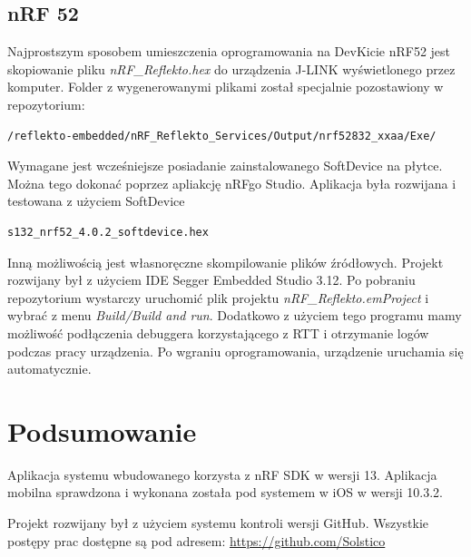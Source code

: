 \documentclass[a4paper,11pt]{article}
\begin{document}
\subsection{nRF 52}
Najprostszym sposobem umieszczenia oprogramowania na DevKicie nRF52 jest skopiowanie pliku \textit{nRF\_Reflekto.hex} do urządzenia J-LINK wyświetlonego przez komputer. Folder z wygenerowanymi plikami został specjalnie pozostawiony w repozytorium: \begin{lstlisting}
/reflekto-embedded/nRF_Reflekto_Services/Output/nrf52832_xxaa/Exe/
\end{lstlisting} 
Wymagane jest wcześniejsze posiadanie zainstalowanego SoftDevice na płytce. Można tego dokonać poprzez apliakcję nRFgo Studio. Aplikacja była rozwijana i testowana z użyciem SoftDevice
\begin{lstlisting}
s132_nrf52_4.0.2_softdevice.hex
\end{lstlisting}
Inną możliwością jest własnoręczne skompilowanie plików źródłowych. Projekt rozwijany był z użyciem IDE Segger Embedded Studio 3.12. Po pobraniu repozytorium wystarczy uruchomić plik projektu
\textit{nRF\_Reflekto.emProject }i wybrać z menu \textit{Build/Build and run}. Dodatkowo z użyciem tego programu mamy możliwość podłączenia debuggera korzystającego z RTT i otrzymanie logów podczas pracy urządzenia.
Po wgraniu oprogramowania, urządzenie uruchamia się automatycznie.

\section{Podsumowanie}
Aplikacja systemu wbudowanego korzysta z nRF SDK w wersji 13. Aplikacja mobilna sprawdzona i wykonana została pod systemem w iOS w wersji 10.3.2. 

Projekt rozwijany był z użyciem systemu kontroli wersji GitHub. Wszystkie postępy prac dostępne są pod adresem: \url{https://github.com/Solstico}
	
	
\end{document}
